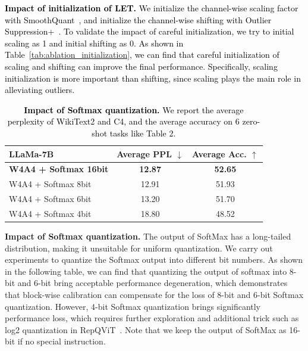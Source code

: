 \documentclass{article} %
\begin{document}
\textcolor{black}{
\textbf{Impact of initialization of LET.} We initialize the channel-wise scaling factor with SmoothQuant~\cite{smoothquant}, and initialize the channel-wise shifting with Outlier Suppression+~\cite{outlier-plus}. To validate the impact of careful initialization, we try to initial scaling as 1 and initial shifting as 0. As shown in Table~\ref{tab:ablation_initialization}, we can find that careful initialization of scaling and shifting can improve the final performance. Specifically, scaling initialization is more important than shifting, since scaling plays the main role in alleviating outliers.
}

\begin{table}[!ht]
    \centering
    \caption{\textcolor{black}{\textbf{Impact of Softmax quantization.} We report the average perplexity of WikiText2 and C4, and the average accuracy on 6 zero-shot tasks like Table 2.}}
    \color{black}
    \begin{tabular}{lcc}
    \hline
    \textbf{LLaMa-7B} & \textbf{Average PPL $\downarrow$} & \textbf{Average Acc. $\uparrow$} \\
    \hline
    \textbf{W4A4 + Softmax 16bit} & \textbf{12.87} & \textbf{52.65} \\
    W4A4 + Softmax 8bit & 12.91 & 51.93 \\
    W4A4 + Softmax 6bit & 13.20 & 51.70 \\
    W4A4 + Softmax 4bit & 18.80 & 48.52 \\
    \hline
    \end{tabular}
    \label{tab:ablation_softmax}
\end{table}

\color{black}
\textbf{Impact of Softmax quantization.}  The output of SoftMax has a long-tailed distribution, making it unsuitable for uniform quantization. We carry out experiments to quantize the Softmax output into different bit numbers. As shown in the following table, we can find that quantizing the output of softmax into 8-bit and 6-bit bring acceptable performance degeneration, which demonstrates that block-wise calibration can compensate for the loss of 8-bit and 6-bit Softmax quantization. However,  4-bit Softmax quantization brings significantly performance loss, which requires further exploration and additional trick such as log2 quantization in RepQViT~\citep{repqvit}. Note that we keep the output of SoftMax as 16-bit if no special instruction.
\color{black}
\end{document}
